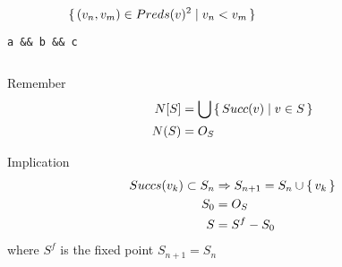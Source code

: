 \documentclass[xcolor = {dvipsnames, table}, aspectratio=169]{beamer}
\begin{document}
\begin{frame}[fragile]
    \begin{columns}
        \begin{column}{0.5\textwidth}
            \centering
            \begin{equation*}
                \set{(v_n, v_m) \in Preds(v)^2 \mid v_n < v_m}
            \end{equation*}
            \lstinline{a && b && c}
        \end{column}

        \begin{column}{0.5\textwidth}
        \end{column}
    \end{columns}
\end{frame}

\begin{frame}
    \begin{block}{Remember}
        \begin{align*}
            N[S] &= \bigcup \set{Succ(v) \mid v \in S} \\
            N(S) &= O_S \\
        \end{align*}
    \end{block}
    \begin{block}{Implication}
        \begin{align*}
            Succs(v_k) \subset S_n & \Rightarrow S_{n+1} = S_n \cup
            \set{v_k} \\
            S_0 &= O_S \\
            S   &= S^f - S_0 \\
        \end{align*}
        where $S^f$ is the fixed point $S_{n+1} = S_n$
    \end{block}
\end{frame}
\end{document}
